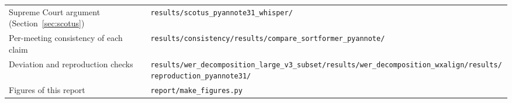 \documentclass[11pt,a4paper]{article}
\begin{document}
\begin{center}
\begin{tabularx}{\textwidth}{@{}L>{\raggedright\arraybackslash}p{8.0cm}@{}}
Supreme Court argument (Section~\ref{sec:scotus}) & \texttt{results/scotus\_pyannote31\_whisper/} \\
Per-meeting consistency of each claim & \texttt{results/consistency/}\newline \texttt{results/compare\_sortformer\_pyannote/} \\
Deviation and reproduction checks & \texttt{results/wer\_decomposition\_large\_v3\_subset/}\newline \texttt{results/wer\_decomposition\_wxalign/}\newline \texttt{results/reproduction\_pyannote31/} \\
Figures of this report & \texttt{report/make\_figures.py} \\
\bottomrule
\end{tabularx}
\end{center}
\end{document}
